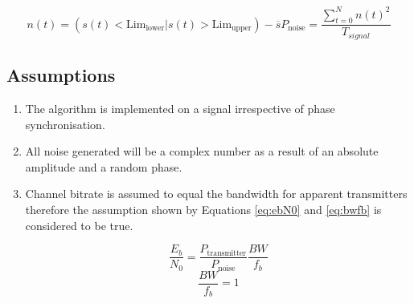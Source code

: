 \begin{multicols}{2}
\begin{subequations}
\begin{equation}
    n(t) = (s(t) < \text{Lim}_{\text{lower}} | s(t) > \text{Lim}_{\text{upper}}) - \overline{s}
    \label{eq:noiseest}
\end{equation}
\begin{equation}
    P_{\text{noise}} = \frac{\sum_{t=0}^{N} n(t)^2}{T_{signal}}
    \label{eq:pnoise}
\end{equation}
\end{subequations}
\end{multicols}

\subsection{Assumptions}
\begin{enumerate}
    \item The algorithm is implemented on a signal irrespective of phase synchronisation.
    \item All noise generated will be a complex number as a result of an absolute amplitude and a random phase.
    \item Channel bitrate is assumed to equal the bandwidth for apparent transmitters therefore the assumption shown by Equations \ref{eq:ebN0} and  \ref{eq:bwfb} is considered to be true.
    \begin{multicols}{2}
    \begin{equation}
        \frac{E_b}{N_0} =  \frac{P_{\text{transmitter}}}{P_{\text{noise}}} \frac{BW}{f_b}
        \label{eq:ebN0}
    \end{equation}
    \begin{equation}
    \frac{BW}{f_b} = 1
    \label{eq:bwfb}
    \end{equation}
    \end{multicols}
\end{enumerate}
